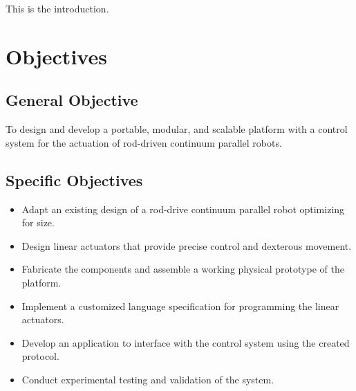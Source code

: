 This is the introduction.

\section{Objectives}

\subsection{General Objective}
To design and develop a portable, modular, and scalable platform with a control system for the actuation of rod-driven continuum parallel robots.

\subsection{Specific Objectives}
\begin{itemize}
    \item Adapt an existing design of a rod-drive continuum parallel robot optimizing for size.
    \item Design linear actuators that provide precise control and dexterous movement.
    \item Fabricate the components and assemble a working physical prototype of the platform.
    \item Implement a customized language specification for programming the linear actuators.
    \item Develop an application to interface with the control system using the created protocol.
    \item Conduct experimental testing and validation of the system.
\end{itemize}